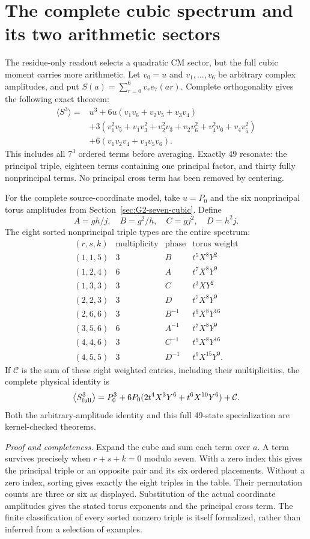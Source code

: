 \documentclass[11pt]{article}
\begin{document}
\section{The complete cubic spectrum and its two arithmetic sectors}
\label{sec:G2-seven-spectrum}

The residue-only readout selects a quadratic CM sector, but the full
cubic moment carries more arithmetic. Let $v_0=u$ and $v_1,\ldots,v_6$
be arbitrary complex amplitudes, and put
$S(a)=\sum_{r=0}^6v_re_7(ar)$. Complete orthogonality gives the
following exact theorem:
\[
\begin{split}
 \langle S^3\rangle={}&u^3+
 6u(v_1v_6+v_2v_5+v_3v_4)\\
 &+3(v_1^2v_5+v_1v_3^2+v_2^2v_3
              +v_2v_6^2+v_4^2v_6+v_4v_5^2)\\
 &+6(v_1v_2v_4+v_3v_5v_6).
\end{split}
\]
This includes all $7^3$ ordered terms before averaging. Exactly 49
resonate: the principal triple, eighteen terms containing one principal
factor, and thirty fully nonprincipal terms. No principal cross term
has been removed by centering.

For the complete source-coordinate model, take $u=P_0$ and the six
nonprincipal torus amplitudes from Section~\ref{sec:G2-seven-cubic}.
Define
\[
 A=gh/j,\quad B=g^2/h,\quad C=gj^2,\quad D=h^2j.
\]
The eight sorted nonprincipal triple types are the entire spectrum:
\[
\begin{array}{c|c|c|c}
(r,s,k)&\text{multiplicity}&\text{phase}&\text{torus weight}\\ \hline
(1,1,5)&3&B&t^5X^8Y^2\\
(1,2,4)&6&A&t^7X^8Y^9\\
(1,3,3)&3&C&t^3XY^2\\
(2,2,3)&3&D&t^7X^8Y^9\\
(2,6,6)&3&B^{-1}&t^9X^8Y^{16}\\
(3,5,6)&6&A^{-1}&t^7X^8Y^9\\
(4,4,6)&3&C^{-1}&t^9X^8Y^{16}\\
(4,5,5)&3&D^{-1}&t^9X^{15}Y^9 .
\end{array}
\]
If $\mathcal C$ is the sum of these eight weighted entries, including
their multiplicities, the complete physical identity is
\[
 \left\langle S_{\rm full}^3\right\rangle
 =P_0^3+6P_0(2t^4X^3Y^6+t^6X^{10}Y^6)+\mathcal C.
\]
Both the arbitrary-amplitude identity and this full 49-state
specialization are kernel-checked theorems.

\emph{Proof and completeness.}
Expand the cube and sum each term over $a$. A term survives precisely
when $r+s+k=0$ modulo seven. With a zero index this gives the principal
triple or an opposite pair and its six ordered placements. Without a
zero index, sorting gives exactly the eight triples in the table.
Their permutation counts are three or six as displayed. Substitution
of the actual coordinate amplitudes gives the stated torus exponents
and the principal cross term. The finite classification of every
sorted nonzero triple is itself formalized, rather than inferred
from a selection of examples.
\end{document}
